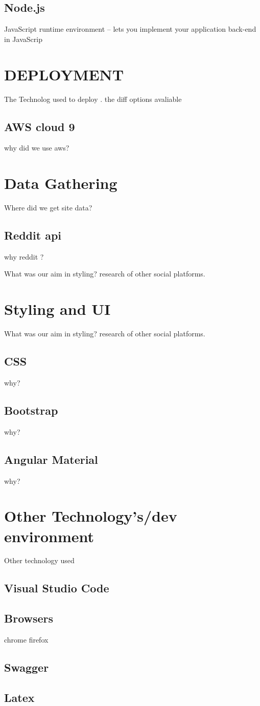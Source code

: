 \subsection{Node.js}
JavaScript runtime environment – lets you implement your application back-end in JavaScrip
\section{DEPLOYMENT}
The Technolog used to deploy . the diff options avaliable 
\subsection{AWS cloud 9}
why did we use aws?


\section{Data Gathering}
Where did we get site data?
\subsection{Reddit api}
why reddit ?

What was our aim in styling? research of other social platforms.

\section{Styling and UI}
What was our aim in styling? research of other social platforms.

\subsection{CSS}
why?
\subsection{Bootstrap}
why?
\subsection{Angular Material}
why?

\section{Other Technology's/dev environment}
Other technology used
\subsection{Visual Studio Code}
\subsection{Browsers}
chrome firefox
\subsection{Swagger}
\subsection{Latex}




